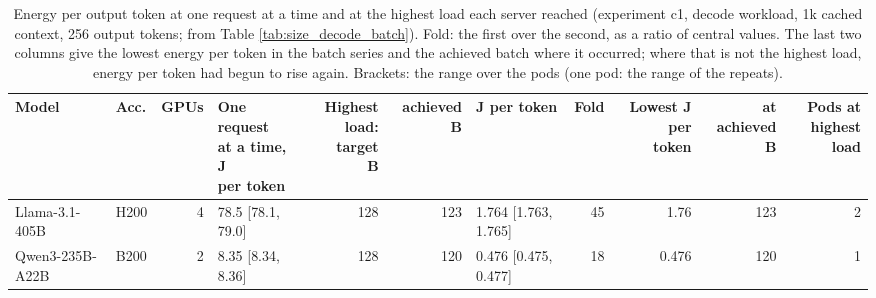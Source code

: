 \begin{landscape}
\begin{table}[t]
\centering
\scriptsize
\setlength{\tabcolsep}{3pt}
\caption{Energy per output token at one request at a time and at the highest load each server reached (experiment c1, decode workload, 1k cached context, 256 output tokens; from Table \ref{tab:size_decode_batch}). Fold: the first over the second, as a ratio of central values. The last two columns give the lowest energy per token in the batch series and the achieved batch where it occurred; where that is not the highest load, energy per token had begun to rise again. Brackets: the range over the pods (one pod: the range of the repeats).}\label{tab:size_batch_summary}
\begin{tabular}{llrlrrlrrrr}
\toprule
Model & Acc. & GPUs & \makecell[l]{One request\\at a time, J\\per token} & \makecell[r]{Highest\\load: target\\B} & achieved B & J per token & Fold & \makecell[r]{Lowest J per\\token} & \makecell[r]{at achieved\\B} & \makecell[r]{Pods at\\highest load} \\
\midrule
Llama-3.1-405B & H200 & 4 & 78.5 {[}78.1, 79.0{]} & 128 & 123 & 1.764 {[}1.763, 1.765{]} & 45 & 1.76 & 123 & 2 \\
Qwen3-235B-A22B & B200 & 2 & 8.35 {[}8.34, 8.36{]} & 128 & 120 & 0.476 {[}0.475, 0.477{]} & 18 & 0.476 & 120 & 1 \\
\bottomrule
\end{tabular}
\end{table}
\end{landscape}
\restoregeometry
